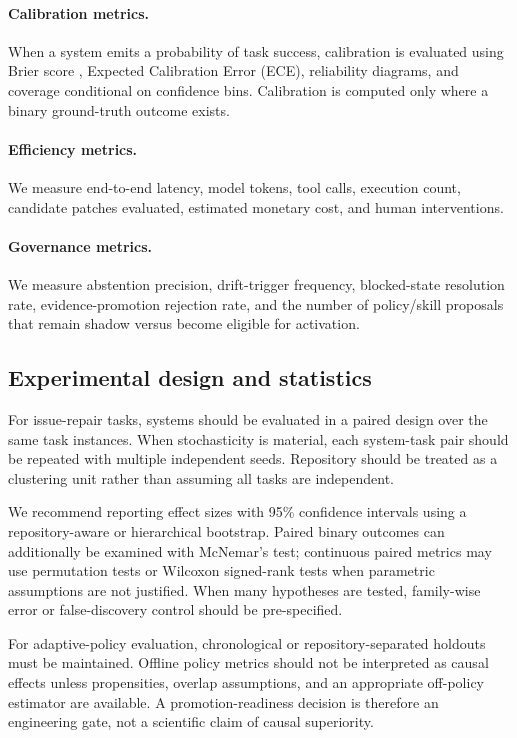 \paragraph{Calibration metrics.}
When a system emits a probability of task success, calibration is evaluated using Brier score \cite{brier1950verification}, Expected Calibration Error (ECE), reliability diagrams, and coverage conditional on confidence bins. Calibration is computed only where a binary ground-truth outcome exists.

\paragraph{Efficiency metrics.}
We measure end-to-end latency, model tokens, tool calls, execution count, candidate patches evaluated, estimated monetary cost, and human interventions.

\paragraph{Governance metrics.}
We measure abstention precision, drift-trigger frequency, blocked-state resolution rate, evidence-promotion rejection rate, and the number of policy/skill proposals that remain shadow versus become eligible for activation.

\subsection{Experimental design and statistics}

For issue-repair tasks, systems should be evaluated in a paired design over the same task instances. When stochasticity is material, each system-task pair should be repeated with multiple independent seeds. Repository should be treated as a clustering unit rather than assuming all tasks are independent.

We recommend reporting effect sizes with 95\% confidence intervals using a repository-aware or hierarchical bootstrap. Paired binary outcomes can additionally be examined with McNemar's test; continuous paired metrics may use permutation tests or Wilcoxon signed-rank tests when parametric assumptions are not justified. When many hypotheses are tested, family-wise error or false-discovery control should be pre-specified.

For adaptive-policy evaluation, chronological or repository-separated holdouts must be maintained. Offline policy metrics should not be interpreted as causal effects unless propensities, overlap assumptions, and an appropriate off-policy estimator are available. A promotion-readiness decision is therefore an engineering gate, not a scientific claim of causal superiority.

